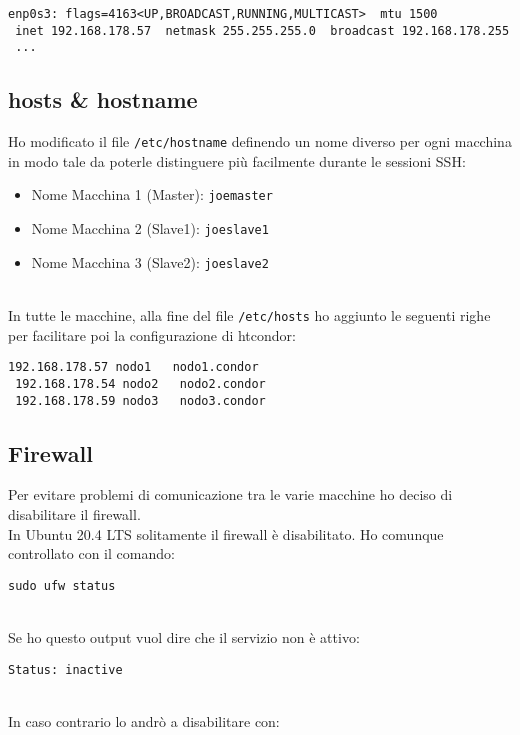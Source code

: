 \begin{lstlisting}[style=output]
 enp0s3: flags=4163<UP,BROADCAST,RUNNING,MULTICAST>  mtu 1500
 inet 192.168.178.57  netmask 255.255.255.0  broadcast 192.168.178.255
 ...
\end{lstlisting}
 
 \subsection{hosts \& hostname}
 \label{sec:hosts}
 
 Ho modificato il file \lstinline[style=cmd]|/etc/hostname| definendo un nome diverso per ogni macchina in modo
 tale da poterle distinguere pi\`{u} facilmente durante le sessioni SSH:
 
 \begin{itemize}
 	\item Nome Macchina 1 (Master): \lstinline[style=cmd]|joemaster|
 	\item Nome Macchina 2 (Slave1): \lstinline[style=cmd]|joeslave1|
 	\item Nome Macchina 3 (Slave2): \lstinline[style=cmd]|joeslave2|
 \end{itemize} 
\ \\
In tutte le macchine, alla fine del file \lstinline[style=cmd]|/etc/hosts| ho aggiunto le seguenti righe per
facilitare poi la configurazione di htcondor:

\begin{lstlisting}[style=cmd]
 192.168.178.57	nodo1	nodo1.condor
 192.168.178.54	nodo2	nodo2.condor
 192.168.178.59	nodo3	nodo3.condor
\end{lstlisting}

\subsection{Firewall}

Per evitare problemi di comunicazione tra le varie macchine ho deciso di disabilitare il firewall.\\
In Ubuntu 20.4 LTS solitamente il firewall \`{e} disabilitato. Ho comunque controllato con il comando:

\begin{lstlisting}[style=cmd]
 sudo ufw status
\end{lstlisting}
\ \\
Se ho questo output vuol dire che il servizio non \`{e} attivo:

\begin{lstlisting}[style=output]
 Status: inactive
\end{lstlisting}
\ \\
In caso contrario lo andr\`{o} a disabilitare con:

